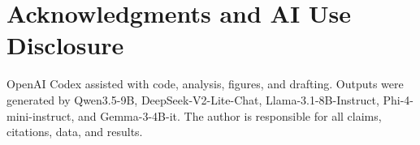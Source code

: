 \documentclass[conference]{IEEEtran}
\begin{document}
\section*{Acknowledgments and AI Use Disclosure}
OpenAI Codex assisted with code, analysis, figures, and drafting. Outputs were generated by Qwen3.5-9B, DeepSeek-V2-Lite-Chat, Llama-3.1-8B-Instruct, Phi-4-mini-instruct, and Gemma-3-4B-it. The author is responsible for all claims, citations, data, and results.



\end{document}
